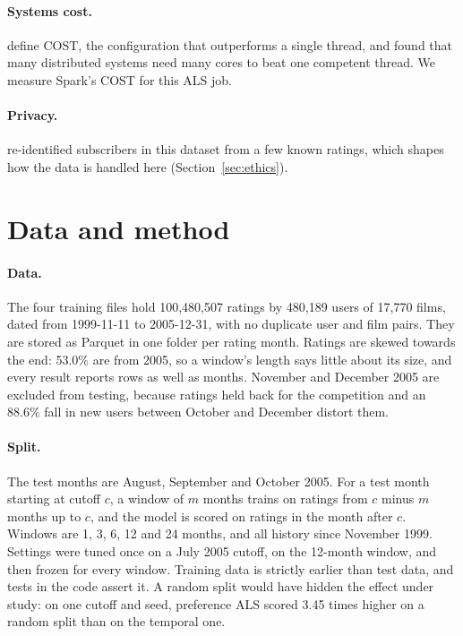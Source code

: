 \documentclass[11pt]{article}
\begin{document}
\paragraph{Systems cost.} \citet{mcsherry2015cost} define COST, the configuration that
outperforms a single thread, and found that many distributed systems need many cores to beat one
competent thread. We measure Spark's COST for this ALS job.

\paragraph{Privacy.} \citet{narayanan2008deanon} re-identified subscribers in this dataset from a
few known ratings, which shapes how the data is handled here (Section~\ref{sec:ethics}).

\section{Data and method}

\paragraph{Data.} The four training files hold 100,480,507 ratings by 480,189 users of 17,770
films, dated from 1999-11-11 to 2005-12-31, with no duplicate user and film pairs. They are stored
as Parquet in one folder per rating month. Ratings are skewed towards the end: 53.0\% are from
2005, so a window's length says little about its size, and every result reports rows as well as
months. November and December 2005 are excluded from testing, because ratings held back for the
competition and an 88.6\% fall in new users between October and December distort them.

\paragraph{Split.} The test months are August, September and October 2005. For a test month
starting at cutoff $c$, a window of $m$ months trains on ratings from $c$ minus $m$ months up to
$c$, and the model is scored on ratings in the month after $c$. Windows are 1, 3, 6, 12 and 24
months, and all history since November 1999. Settings were tuned once on a July 2005 cutoff, on
the 12-month window, and then frozen for every window. Training data is strictly earlier than
test data, and tests in the code assert it. A random split would have hidden the effect under
study: on one cutoff and seed, preference ALS scored 3.45 times higher on a random split than on
the temporal one.
\end{document}
